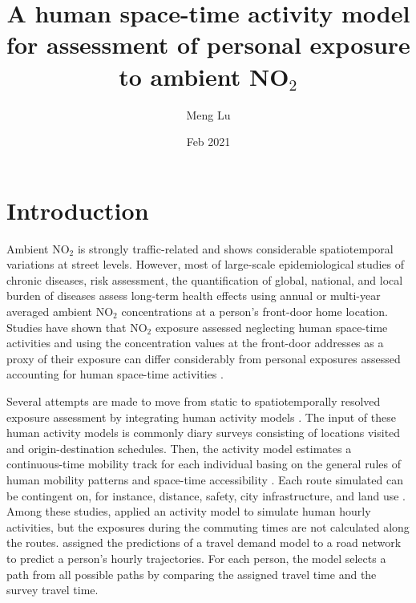 \documentclass[]{article}
\author{Meng Lu }
\date{Feb 2021}
\title{A human space-time activity model for assessment of personal exposure to ambient NO$_2$}
\begin{document}
\maketitle
 
\section{Introduction}

Ambient NO$_2$ is strongly traffic-related and shows considerable spatiotemporal variations at street levels. However, most of large-scale epidemiological studies of chronic diseases, risk assessment, the quantification of global, national, and local burden of diseases \citep{achakulwisut2019global} assess long-term health effects using annual or multi-year averaged ambient NO$_2$ concentrations at a person’s front-door home location. Studies have shown that NO$_2$ exposure assessed neglecting human space-time activities and using the concentration values at the front-door addresses as a proxy of their exposure can differ considerably from personal exposures assessed accounting for human space-time activities \citep{duan1997combination,lu2019activity,park2017individual,molter2012performance,zenk2011activity}. 

Several attempts are made to move from static to spatiotemporally resolved exposure assessment \citep{steinle2013quantifying} by integrating human activity models \citep{miller2003prototype, shekarrizfard2017regional, deffner2016personal,gulliver2005time,dons2011impact}. The input of these human activity models is commonly diary surveys consisting of locations visited and origin-destination schedules. Then, the activity model estimates a continuous-time mobility track for each individual basing on the general rules of human mobility patterns and space-time accessibility \citep{nguyen2011steps,gonzalez2008understanding,yang2010using,yu2006spatio,alessandretti2017multi,miller1991modelling}. Each route simulated can be contingent on, for instance, distance, safety, city infrastructure, and land use \citep{law2014measuring}. Among these studies, \cite{beckx2009dynamic} applied an activity model \citep{ALBATROSS} to simulate human hourly activities, but the exposures during the commuting times are not calculated along the routes. \cite{shekarrizfard2017regional} assigned the predictions of a travel demand model to a road network to predict a person's hourly trajectories. For each person, the model selects a path from all possible paths by comparing the assigned travel time and the survey travel time. 
\end{document}
